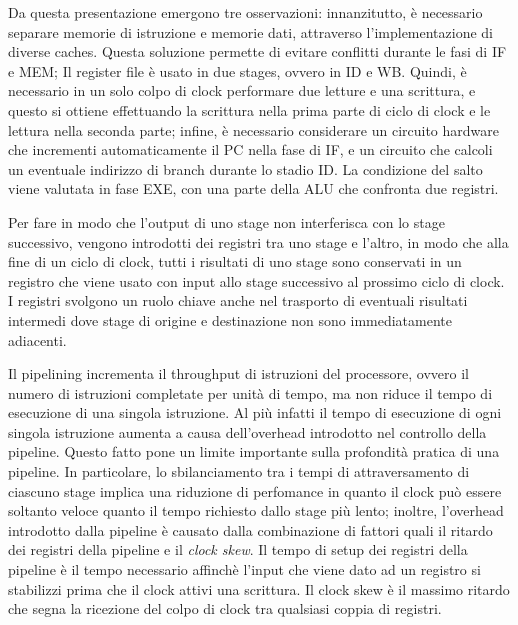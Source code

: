 Da questa presentazione emergono tre osservazioni: innanzitutto, è necessario separare memorie di istruzione e memorie dati, attraverso l'implementazione di diverse caches. Questa soluzione permette di evitare conflitti durante le fasi di IF e MEM; Il register file è usato in due stages, ovvero in ID e WB. Quindi, è necessario in un solo colpo di clock performare due letture e una scrittura, e questo si ottiene effettuando la scrittura nella prima parte di ciclo di clock e le lettura nella seconda parte; infine, è necessario considerare un circuito hardware che incrementi automaticamente il PC nella fase di IF, e un circuito che calcoli un eventuale indirizzo di branch durante lo stadio ID. La condizione del salto viene valutata in fase EXE, con una parte della ALU che confronta due registri. 

\noindent Per fare in modo che l'output di uno stage non interferisca con lo stage successivo, vengono introdotti dei registri tra uno stage e l'altro, in modo che alla fine di un ciclo di clock, tutti i risultati di uno stage sono conservati in un registro che viene usato con input allo stage successivo al prossimo ciclo di clock. I registri svolgono un ruolo chiave anche nel trasporto di eventuali risultati intermedi dove stage di origine e destinazione non sono immediatamente adiacenti. 

Il pipelining incrementa il throughput di istruzioni del processore, ovvero il numero di istruzioni completate per unità di tempo, ma non riduce il tempo di esecuzione di una singola istruzione. Al più infatti il tempo di esecuzione di ogni singola istruzione aumenta a causa dell'overhead introdotto nel controllo della pipeline. Questo fatto pone un limite importante sulla profondità pratica di una pipeline. 
In particolare, lo sbilanciamento tra i tempi di attraversamento di ciascuno stage implica una riduzione di perfomance in quanto il clock può essere soltanto veloce quanto il tempo richiesto dallo stage più lento; inoltre, l'overhead introdotto dalla pipeline è causato dalla combinazione di fattori quali il ritardo dei registri della pipeline e il \textit{clock skew}. Il tempo di setup dei registri della pipeline è il tempo necessario affinchè l'input che viene dato ad un registro si stabilizzi prima che il clock attivi una scrittura. Il clock skew è il massimo ritardo che segna la ricezione del colpo di clock tra qualsiasi coppia di registri.

